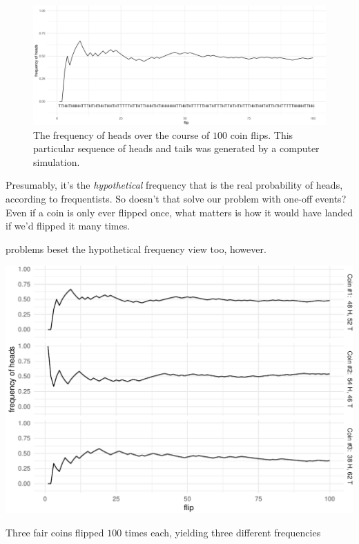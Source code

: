 \documentclass[justified]{tufte-book}
\theoremstyle{definition}
\theoremstyle{definition}
\theoremstyle{definition}
\theoremstyle{remark}
\begin{document}
\begin{figure}
\includegraphics{_main_files/figure-latex/hundredflips-1} \caption[The frequency of heads over the course of $100$ coin flips]{The frequency of heads over the course of $100$ coin flips. This particular sequence of heads and tails was generated by a computer simulation.}\label{fig:hundredflips}
\end{figure}

Presumably, it's the \emph{hypothetical} frequency that is the real probability of heads, according to frequentists. So doesn't that solve our problem with one-off events? Even if a coin is only ever flipped once, what matters is how it would have landed if we'd flipped it many times.

 problems beset the hypothetical frequency view too, however.

\begin{marginfigure}
\includegraphics{_main_files/figure-latex/threecoins-1} \caption[Three fair coins flipped $100$ times each, yielding three different frequencies]{Three fair coins flipped $100$ times each, yielding three different frequencies}\label{fig:threecoins}
\end{marginfigure}
\end{document}
